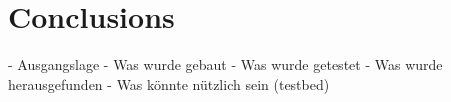 \chapter{Conclusions}
\label{c:conclusions} 
- Ausgangslage
- Was wurde gebaut
- Was wurde getestet
- Was wurde herausgefunden
- Was könnte nützlich sein (testbed)
